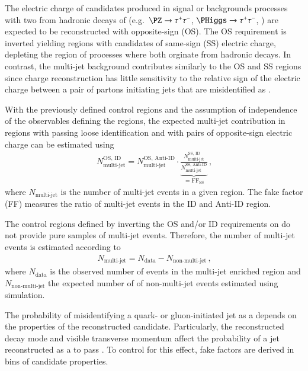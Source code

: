 The electric charge of \tauhadvis candidates produced in signal or
backgrounds processes with two \tauhadvis from hadronic decays of
\tauleptons (e.g.\ $\PZ \to \tautau$, $\PHiggs \to \tautau$, \ttbar)
are expected to be reconstructed with opposite-sign (OS). The OS
requirement is inverted yielding regions with \tauhadvis candidates of
same-sign (SS) electric charge, depleting the region of processes
where both \tauhadvis orginate from hadronic \taulepton decays. In
contrast, the multi-jet background contributes similarly to the OS and
SS regions since \tauhadvis charge reconstruction has little
sensitivity to the relative sign of the electric charge between a pair
of partons initiating jets that are misidentified as \tauhadvis.

With the previously defined control regions and the assumption of
independence of the observables defining the regions, the expected
multi-jet contribution in regions with \tauhadvis passing loose
identification and with \tauhadvis pairs of opposite-sign electric
charge can be estimated using
\begin{align*}
  N_\text{multi-jet}^{\text{OS, ID}} =
  N_\text{multi-jet}^{\text{OS, Anti-ID}}
  \cdot
  \underbrace{\frac{N_\text{multi-jet}^{\text{SS, ID}}}
  {N_\text{multi-jet}^{\text{SS, Anti-ID}}}}
  _{= \text{FF}_{\text{SS}}} \,\text{,}
\end{align*}
where $N_\text{multi-jet}$ is the number of multi-jet events in a
given region. The fake factor (FF) measures the ratio of multi-jet
events in the ID and Anti-ID region.%

The control regions defined by inverting the OS and/or ID requirements
on \tauhadvis do not provide pure samples of multi-jet
events. Therefore, the number of multi-jet events is estimated
according to
\begin{align*}
  N_\text{multi-jet} = N_\text{data} - N_\text{non-multi-jet} \,\text{,}
\end{align*}
where $N_\text{data}$ is the observed number of events in the
multi-jet enriched region and $N_\text{non-multi-jet}$ the expected
number of of non-multi-jet events estimated using simulation.

The probability of misidentifying a quark- or gluon-initiated jet as a
\tauhadvis depends on the properties of the reconstructed \tauhadvis
candidate. Particularly, the reconstructed decay mode and visible
transverse momentum affect the probability of a jet reconstructed as a
\tauhadvis to pass \tauid. To control for this effect, fake factors
are derived in bins of \tauhadvis candidate properties.

